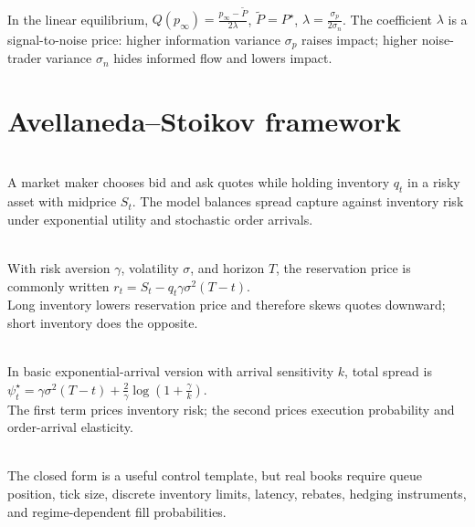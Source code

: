 \documentclass[a4paper,oneside,openany]{book}
\begin{document}
\begin{model} \\
In the linear equilibrium, $Q(p_\infty)=\frac{p_\infty-\tilde{P}}{2\lambda}$, $\tilde{P}=P^\star$, $\lambda=\frac{\sigma_p}{2\sigma_n}$. The coefficient $\lambda$ is a signal-to-noise price: higher information variance $\sigma_p$ raises impact; higher noise-trader variance $\sigma_n$ hides informed flow and lowers impact.
\end{model}

\section*{Avellaneda--Stoikov framework}

\begin{model} \\
A market maker chooses bid and ask quotes while holding inventory $q_t$ in a risky asset with midprice $S_t$. The model balances spread capture against inventory risk under exponential utility and stochastic order arrivals.
\end{model}

\begin{model} \\
With risk aversion $\gamma$, volatility $\sigma$, and horizon $T$, the reservation price is commonly written $r_t=S_t-q_t\gamma\sigma^2(T-t)$.\\
Long inventory lowers reservation price and therefore skews quotes downward; short inventory does the opposite.
\end{model}

\begin{model} \\
In basic exponential-arrival version with arrival sensitivity $k$, total spread is $\psi_t^\star=\gamma\sigma^2(T-t)+\frac{2}{\gamma}\log\left(1+\frac{\gamma}{k}\right)$.\\
The first term prices inventory risk; the second prices execution probability and order-arrival elasticity.
\end{model}

\begin{caveat} \\
The closed form is a useful control template, but real books require queue position, tick size, discrete inventory limits, latency, rebates, hedging instruments, and regime-dependent fill probabilities.
\end{caveat}
\end{document}
